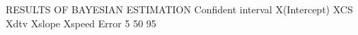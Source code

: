 RESULTS OF BAYESIAN ESTIMATION 
Confident interval 
    X(Intercept)        XCS          Xdtv      Xslope      Xspeed	Error
5%
50%
95%
